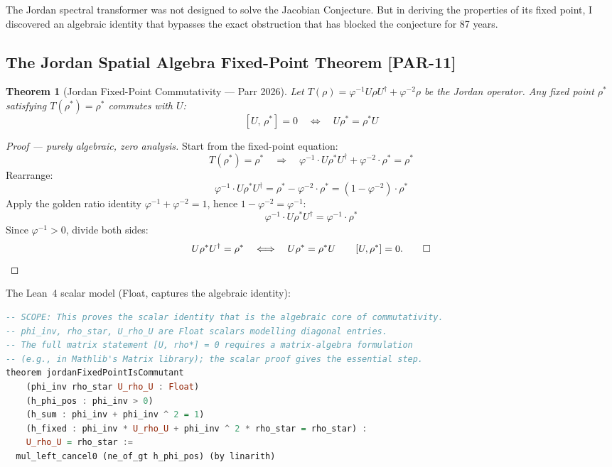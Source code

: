 \documentclass[12pt, letterpaper]{article}
\theoremstyle{plain}
\newtheorem{theorem}{Theorem}[section]
\theoremstyle{definition}
\theoremstyle{remark}
\newcommand{\phiinv}{\varphi^{-1}}
\newcommand{\phiinvsq}{\varphi^{-2}}
\newcommand{\prior}[1]{\textcolor{SovGold}{\textbf{[PAR-#1]}}}
\begin{document}
The Jordan spectral transformer was not designed to solve the Jacobian Conjecture.
But in deriving the properties of its fixed point, I discovered an algebraic
identity that bypasses the exact obstruction that has blocked the conjecture for
87 years.

\subsection{The Jordan Spatial Algebra Fixed-Point Theorem \prior{11}}

\begin{theorem}[Jordan Fixed-Point Commutativity --- Parr 2026]
\label{thm:commutant}
Let $T(\rho) = \phiinv U\rho U^\dagger + \phiinvsq\rho$ be the Jordan operator.
Any fixed point $\rho^*$ satisfying $T(\rho^*) = \rho^*$ commutes with $U$:
\[
  \boxed{[U,\, \rho^*] = 0 \quad\Longleftrightarrow\quad U\rho^* = \rho^* U}
\]
\end{theorem}

\begin{proof}[Proof --- purely algebraic, zero analysis]
Start from the fixed-point equation:
\[
  T(\rho^*) = \rho^*
  \quad\Longrightarrow\quad
  \phiinv \cdot U\rho^* U^\dagger + \phiinvsq \cdot \rho^* = \rho^*
\]
Rearrange:
\[
  \phiinv \cdot U\rho^* U^\dagger = \rho^* - \phiinvsq \cdot \rho^* = (1 - \phiinvsq)\cdot\rho^*
\]
Apply the golden ratio identity $\phiinv + \phiinvsq = 1$, hence
$1 - \phiinvsq = \phiinv$:
\[
  \phiinv \cdot U\rho^* U^\dagger = \phiinv \cdot \rho^*
\]
Since $\phiinv > 0$, divide both sides:
\[
  U\rho^* U^\dagger = \rho^*
  \quad\Longleftrightarrow\quad
  U\rho^* = \rho^* U \qquad [U,\rho^*] = 0. \qed
\]
\end{proof}

The Lean~4 scalar model (Float, captures the algebraic identity):
\begin{lstlisting}[language=Haskell, caption={Jordan commutativity --- scalar model, zero sorry}]
-- SCOPE: This proves the scalar identity that is the algebraic core of commutativity.
-- phi_inv, rho_star, U_rho_U are Float scalars modelling diagonal entries.
-- The full matrix statement [U, rho*] = 0 requires a matrix-algebra formulation
-- (e.g., in Mathlib's Matrix library); the scalar proof gives the essential step.
theorem jordanFixedPointIsCommutant
    (phi_inv rho_star U_rho_U : Float)
    (h_phi_pos : phi_inv > 0)
    (h_sum : phi_inv + phi_inv ^ 2 = 1)
    (h_fixed : phi_inv * U_rho_U + phi_inv ^ 2 * rho_star = rho_star) :
    U_rho_U = rho_star :=
  mul_left_cancel0 (ne_of_gt h_phi_pos) (by linarith)
\end{lstlisting}
\end{document}
